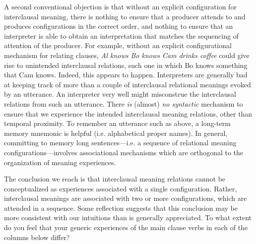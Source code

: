   A second conventional objection is that without an explicit configuration for interclausal meaning, there is nothing to ensure that a producer attends to and produces configurations in the correct order, and nothing to ensure that an interpreter is able to obtain an interpretation that matches the sequencing of attention of the producer. For example, without an explicit configurational mechanism for relating clauses, \textit{Al knows Bo knows Cam drinks coffee} could give rise to unintended interclausal relations, such one in which Bo knows something that Cam knows. Indeed, this appears to happen. Interpreters are generally bad at keeping track of more than a couple of interclausal relational meanings evoked by an utterance. An interpreter very well might misconstrue the interclausal relations from such an utterance. There \textit{is} (almost) \textit{no syntactic} mechanism to ensure that we experience the intended interclausal meaning relations, other than temporal proximity. To remember an utterance such as above, a long-term memory mnemonic is helpful (i.e. alphabetical proper names). In general, committing to memory long sentences—i.e. a sequence of relational meaning configurations—involves associational mechanisms which are orthogonal to the organization of meaning experiences.

  The conclusion we reach is that interclausal meaning relations cannot be conceptualized as experiences associated with a single configuration. Rather, interclausal meanings are associated with two or more configurations, which are attended in a sequence. Some reflection suggests that this conclusion may be more consistent with our intuitions than is generally appreciated. To what extent do you feel that your generic experiences of the main clause verbs in each of the columns below differ?


